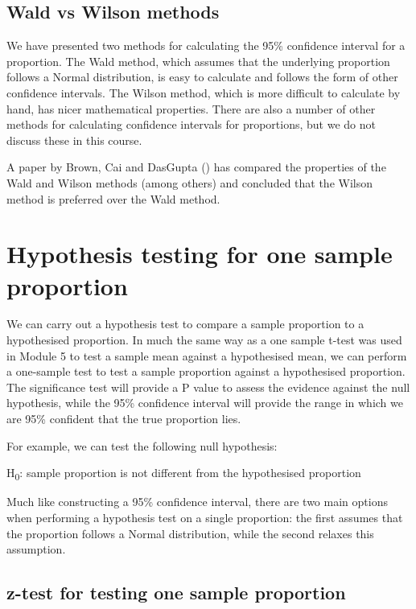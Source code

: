 \documentclass[
]{memoir}
\begin{document}
\hypertarget{wald-vs-wilson-methods}{%
\subsection{Wald vs Wilson methods}\label{wald-vs-wilson-methods}}

We have presented two methods for calculating the 95\% confidence interval for a proportion. The Wald method, which assumes that the underlying proportion follows a Normal distribution, is easy to calculate and follows the form of other confidence intervals. The Wilson method, which is more difficult to calculate by hand, has nicer mathematical properties. There are also a number of other methods for calculating confidence intervals for proportions, but we do not discuss these in this course.

A paper by Brown, Cai and DasGupta (\citet{brown_etal01}) has compared the properties of the Wald and Wilson methods (among others) and concluded that the Wilson method is preferred over the Wald method.

\hypertarget{hypothesis-testing-for-one-sample-proportion}{%
\section{Hypothesis testing for one sample proportion}\label{hypothesis-testing-for-one-sample-proportion}}

We can carry out a hypothesis test to compare a sample proportion to a hypothesised proportion. In much the same way as a one sample t-test was used in Module 5 to test a sample mean against a hypothesised mean, we can perform a one-sample test to test a sample proportion against a hypothesised proportion. The significance test will provide a P value to assess the evidence against the null hypothesis, while the 95\% confidence interval will provide the range in which we are 95\% confident that the true proportion lies.

For example, we can test the following null hypothesis:

H\textsubscript{0}: sample proportion is not different from the hypothesised proportion

Much like constructing a 95\% confidence interval, there are two main options when performing a hypothesis test on a single proportion: the first assumes that the proportion follows a Normal distribution, while the second relaxes this assumption.

\hypertarget{z-test-for-testing-one-sample-proportion}{%
\subsection{z-test for testing one sample proportion}\label{z-test-for-testing-one-sample-proportion}}
\end{document}
